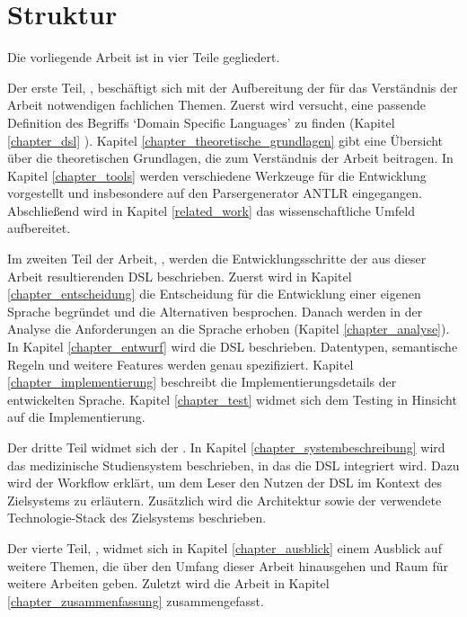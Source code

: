 \section{Struktur}

Die vorliegende Arbeit ist in vier Teile gegliedert.

Der erste Teil, \emph{}, beschäftigt sich mit der Aufbereitung der für das Verständnis der Arbeit notwendigen fachlichen Themen. Zuerst wird versucht, eine passende Definition des Begriffs `Domain Specific Languages' zu finden (Kapitel \ref{chapter_dsl} ). Kapitel \ref{chapter_theoretische_grundlagen} gibt eine Übersicht über die theoretischen Grundlagen, die zum Verständnis der Arbeit beitragen. In Kapitel \ref{chapter_tools} werden verschiedene Werkzeuge für die Entwicklung vorgestellt und insbesondere auf den Parsergenerator ANTLR eingegangen. Abschließend wird in Kapitel \ref{related_work} das wissenschaftliche Umfeld aufbereitet.

Im zweiten Teil der Arbeit, \emph{}, werden die Entwicklungsschritte der aus dieser Arbeit resultierenden DSL beschrieben. Zuerst wird in Kapitel \ref{chapter_entscheidung} die Entscheidung für die Entwicklung einer eigenen Sprache begründet und die Alternativen besprochen. Danach werden in der Analyse die Anforderungen an die Sprache erhoben (Kapitel \ref{chapter_analyse}). In Kapitel \ref{chapter_entwurf} wird die DSL beschrieben. Datentypen, semantische Regeln und weitere Features werden genau spezifiziert. Kapitel \ref{chapter_implementierung} beschreibt die Implementierungsdetails der entwickelten Sprache. Kapitel \ref{chapter_test} widmet sich dem Testing in Hinsicht auf die Implementierung.

Der dritte Teil widmet sich der \emph{}. In Kapitel \ref{chapter_systembeschreibung} wird das medizinische Studiensystem beschrieben, in das die DSL integriert wird. Dazu wird der Workflow erklärt, um dem Leser den Nutzen der DSL im Kontext des Zielsystems zu erläutern. Zusätzlich wird die Architektur sowie der verwendete Technologie-Stack des Zielsystems beschrieben.

Der vierte Teil, \emph{}, widmet sich in Kapitel \ref{chapter_ausblick} einem Ausblick auf weitere Themen, die über den Umfang dieser Arbeit hinausgehen und Raum für weitere Arbeiten geben. Zuletzt wird die Arbeit in Kapitel \ref{chapter_zusammenfassung} zusammengefasst.




